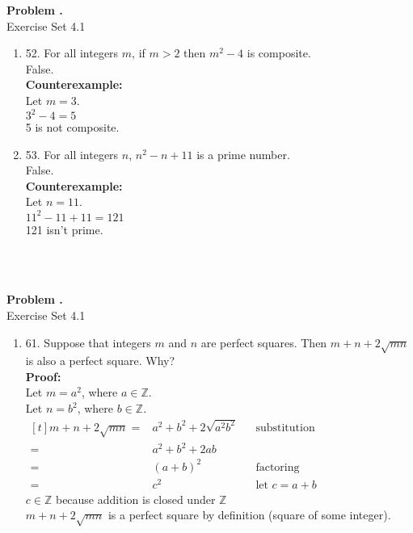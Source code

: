 \documentclass[letterpaper,fleqn]{article}
\begin{document}
	\setcounter{pcount}{1}
	
	\newcommand{\rawproblem}[1]{
		\noindent\begin{minipage}{\textwidth}
			\textbf{Problem \thepcount\stepcounter{pcount}.} \\
			#1
		\end{minipage} \\
		\\
	}
	\newcommand{\problem}[2]{
		\rawproblem{
			Exercise Set 4.#1
			\begin{enumerate}
				#2
			\end{enumerate}
		}
	}
	
	\newcommand{\case}[2]{\cellcolor{yellow!25}\textbf{Case #1:} #2}
	\newcommand{\theorem}[2]{
		\cellcolor{green!25}\textbf{Theorem #1:} \\
		\hline
		#2
	}
	
	\problem{1}{
	\item [52.]
	For all integers $m$, if $m>2$ then $m^2-4$ is composite. \\
	False. \\
	\textbf{Counterexample:} \\
	Let $m=3$. \\
	$3^2-4=5$ \\
	5 is not composite.
	
	\item [53.]
	For all integers $n$, $n^2-n+11$ is a prime number. \\
	False. \\
	\textbf{Counterexample:} \\
	Let $n=11$. \\
	$11^2-11+11=121$ \\
	121 isn't prime.
	}
	
	\problem{1}{
	\item [61.]
	Suppose that integers $m$ and $n$ are perfect squares. Then $m+n+2\sqrt{mn}$ is also a perfect square. Why? \\
	\textbf{Proof:} \\
	Let $m=a^2$, where $a \in \mathbb{Z}$. \\
	Let $n=b^2$, where $b \in \mathbb{Z}$. \\
	$\begin{aligned}[t]
		m+n+2\sqrt{mn} ={} & a^2+b^2+2\sqrt{a^2b^2}  && \text{substitution} \\
		={} & a^2+b^2+2ab \\
		={} & (a+b)^2 && \text{factoring} \\
		={} & c^2 && \text{let $c=a+b$}
	\end{aligned}$ \\
	$c \in \mathbb{Z}$ because addition is closed under $\mathbb{Z}$ \\
	$m+n+2\sqrt{mn}$ is a perfect square by definition (square of some integer).
	}
	
\end{document}

